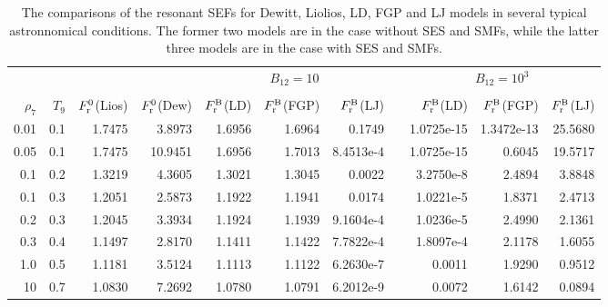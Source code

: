\documentclass[manuscript]{aastex}
\begin{document}
\begin{table*}[htb]\footnotesize
 \centering
 \begin{minipage}{140mm}
  \caption{The comparisons of the resonant SEFs for Dewitt, Liolios, LD,  FGP and LJ models
  in several typical astronnomical conditions. The former two models are in the case without
  SES and SMFs, while the latter three models are in the case with SES and SMFs.}
  \begin{tabular}{@{}rrrrrrrrrrr@{}}
  \hline
 &  & & &\multicolumn{3}{c}{$B_{12}=10$}& &\multicolumn{3}{c}{$B_{12}=10^3$}\\

\cline{5-7} \cline{9-11} \\
 $\rho_7$ &$T_9$& $F_{\rm{r}}^0$(Lios)& $F_{\rm{r}}^0$(Dew)& $F_{\rm{r}}^{\rm{B}}$(LD)& $F_{\rm{r}}^{\rm{B}}$(FGP)
 &$F_{\rm{r}}^{\rm{B}}$(LJ) & & $F_{\rm{r}}^{\rm{B}}$(LD)& $F_{\rm{r}}^{\rm{B}}$(FGP)&$F_{\rm{r}}^{\rm{B}}$(LJ)\\

 \hline
 0.01 &0.1 &1.7475  &3.8973  &1.6956  &1.6964  &0.1749  &&1.0725e-15 &1.3472e-13  &25.5680\\
 0.05 &0.1 &1.7475  &10.9451 &1.6956  &1.7013  &8.4513e-4   &&1.0725e-15  &0.6045  &19.5717\\
 0.1  &0.2 &1.3219  &4.3605  &1.3021  &1.3045  &0.0022  &&3.2750e-8   &2.4894  &3.8848\\
 0.1  &0.3 &1.2051  &2.5873  &1.1922  &1.1941  &0.0174       &&1.0221e-5  &1.8371  &2.4713\\
 0.2  &0.3 &1.2045  &3.3934  &1.1924  &1.1939  &9.1604e-4   &&1.0236e-5   &2.4990  &2.1361\\
 0.3  &0.4 &1.1497  &2.8170  &1.1411  &1.1422  &7.7822e-4 &&1.8097e-4 &2.1178  &1.6055\\
 1.0  &0.5 &1.1181  &3.5124  &1.1113  &1.1122  &6.2630e-7     &&0.0011    &1.9290  &0.9512\\
 10   &0.7 &1.0830  &7.2692  &1.0780  &1.0791  &6.2012e-9     &&0.0072    &1.6142  &0.0894\\
\hline
\end{tabular}
\end{minipage}
\end{table*}

\end{document}
